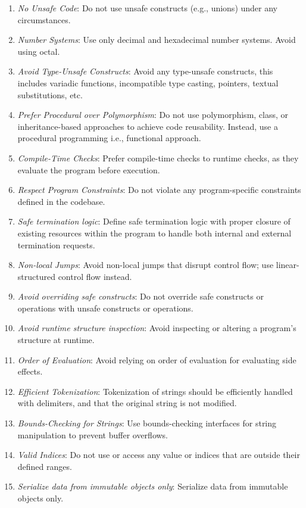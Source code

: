 \documentclass[9pt]{IEEEtran} %
\begin{document}
\begin{enumerate}
  \item \textit{No Unsafe Code}: Do not use unsafe constructs (e.g., unions) under any circumstances.
  \item \textit{Number Systems}: Use only decimal and hexadecimal number systems. Avoid using octal.
  \item \textit{Avoid Type-Unsafe Constructs}: Avoid any type-unsafe constructs, this includes variadic functions, incompatible type casting, pointers, textual substitutions, etc.
  \item \textit{Prefer Procedural over Polymorphism}: Do not use polymorphism, class, or inheritance-based approaches to achieve code reusability. Instead, use a procedural programming i.e., functional approach. 
  \item \textit{Compile-Time Checks}: Prefer compile-time checks to runtime checks, as they evaluate the program before execution. 
  \item \textit{Respect Program Constraints}: Do not violate any program-specific constraints defined in the codebase.
  \item \textit{Safe termination logic}: Define safe termination logic with proper closure of existing resources within the program to handle both internal and external termination requests.
  \item \textit{Non-local Jumps}: Avoid non-local jumps that disrupt control flow; use linear-structured control flow instead.
  \item \textit{Avoid overriding safe constructs}: Do not override safe constructs or operations with unsafe constructs or operations.
  \item \textit{Avoid runtime structure inspection}: Avoid inspecting or altering a program's structure at runtime.
  \item \textit{Order of Evaluation}: Avoid relying on order of evaluation for evaluating side effects.
  \item \textit{Efficient Tokenization}: Tokenization of strings should be efficiently handled with delimiters, and that the original string is not modified.
  \item \textit{Bounds-Checking for Strings}: Use bounds-checking interfaces for string manipulation to prevent buffer overflows. 
  \item \textit{Valid Indices}: Do not use or access any value or indices that are outside their defined ranges.
  \item \textit{Serialize data from immutable objects only}: Serialize data from immutable objects only.
\end{enumerate}
\end{document}
